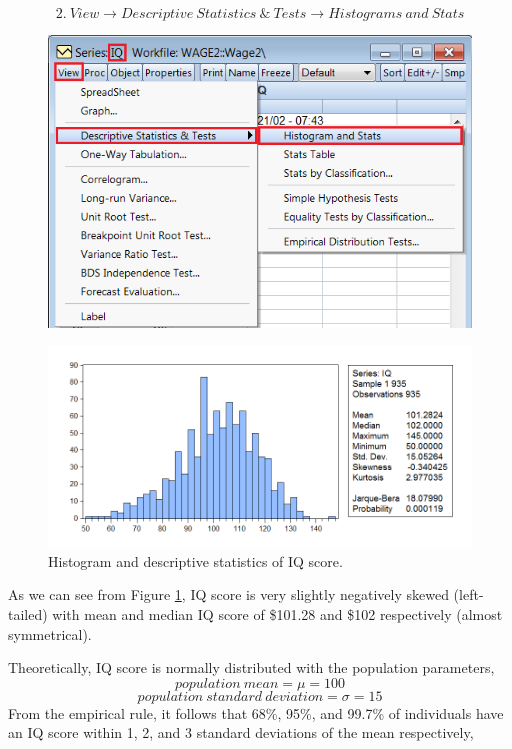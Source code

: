 \documentclass[12pt]{report}
\begin{document}
\vspace{-\baselineskip}
$$2.\ View \to Descriptive\ Statistics\ \&\ Tests \to Histograms\ and\ Stats$$
\begin{figure}[H]
	\centering
	\includegraphics{q3_5}
\end{figure}
\vspace{-\baselineskip}
\begin{figure}[H]
	\centerline{\includegraphics{q3_6}}
	\caption{Histogram and descriptive statistics of IQ score.}
	\label{fig:hist2}
\end{figure}
\vspace{-\baselineskip}
\noindent As we can see from Figure \ref{fig:hist2}, IQ score is very slightly negatively skewed (left-tailed) with mean and median IQ score of \$101.28 and \$102 respectively (almost symmetrical). \par
\noindent Theoretically, IQ score is normally distributed with the population parameters,
$$population\ mean = \mu = 100$$
$$population\ standard\ deviation = \sigma = 15$$
\noindent From the empirical rule, it follows that 68\%, 95\%, and 99.7\% of individuals have an IQ score within 1, 2, and 3 standard deviations of the mean respectively,
\end{document}
